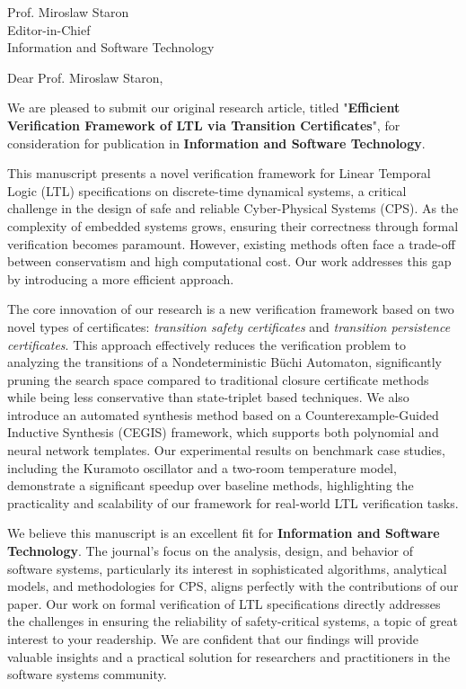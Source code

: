 \documentclass[11pt]{letter}
\newcommand{\EditorName}{Prof. Miroslaw Staron}
\newcommand{\EditorTitle}{Editor-in-Chief}
\newcommand{\JournalName}{Information and Software Technology}
\newcommand{\ManuscriptTitle}{Efficient Verification Framework of LTL via Transition Certificates}
\begin{document}
\begin{letter}{\EditorName \\ \EditorTitle \\ \JournalName}


\opening{Dear \EditorName,}

We are pleased to submit our original research article, titled "\textbf{\ManuscriptTitle}", for consideration for publication in \textbf{\JournalName}.

This manuscript presents a novel verification framework for Linear Temporal Logic (LTL) specifications on discrete-time dynamical systems, a critical challenge in the design of safe and reliable Cyber-Physical Systems (CPS). As the complexity of embedded systems grows, ensuring their correctness through formal verification becomes paramount. However, existing methods often face a trade-off between conservatism and high computational cost. Our work addresses this gap by introducing a more efficient approach.

The core innovation of our research is a new verification framework based on two novel types of certificates: \textit{transition safety certificates} and \textit{transition persistence certificates}. This approach effectively reduces the verification problem to analyzing the transitions of a Nondeterministic Büchi Automaton, significantly pruning the search space compared to traditional closure certificate methods while being less conservative than state-triplet based techniques. We also introduce an automated synthesis method based on a Counterexample-Guided Inductive Synthesis (CEGIS) framework, which supports both polynomial and neural network templates. Our experimental results on benchmark case studies, including the Kuramoto oscillator and a two-room temperature model, demonstrate a significant speedup over baseline methods, highlighting the practicality and scalability of our framework for real-world LTL verification tasks.

We believe this manuscript is an excellent fit for \textbf{\JournalName}. The journal's focus on the analysis, design, and behavior of software systems, particularly its interest in sophisticated algorithms, analytical models, and methodologies for CPS, aligns perfectly with the contributions of our paper. Our work on formal verification of LTL specifications directly addresses the challenges in ensuring the reliability of safety-critical systems, a topic of great interest to your readership. We are confident that our findings will provide valuable insights and a practical solution for researchers and practitioners in the software systems community.


\end{letter}
\end{document}
